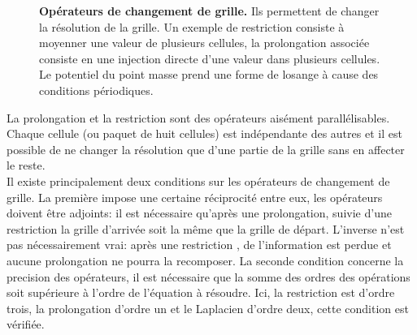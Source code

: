 \begin{figure}[htbp]
\begin{center}
\caption{\textbf{Opérateurs de changement de grille.} Ils permettent de changer la résolution de la grille. Un exemple de restriction consiste à moyenner une valeur de plusieurs cellules, la prolongation associée consiste en une injection directe d'une valeur dans plusieurs cellules.\\
Le potentiel du point masse prend une forme de losange à cause des conditions périodiques.}
\label{Opérateurs de changement de grille}
\end{center}
\end{figure}

La prolongation et la restriction sont des opérateurs aisément parallélisables. Chaque cellule (ou paquet de huit cellules) est indépendante des autres et il est possible de ne changer la résolution que d'une partie de la grille sans en affecter le reste.\\

Il existe principalement deux conditions sur les opérateurs de changement de grille. La première impose une certaine réciprocité entre eux, les opérateurs doivent être adjoints: il est nécessaire qu'après une prolongation, suivie d'une restriction la grille d'arrivée soit la même que la grille de départ. L'inverse n'est pas nécessairement vrai: après une restriction , de l'information est perdue et aucune prolongation ne pourra la recomposer. 
La seconde condition concerne la precision des opérateurs, il est nécessaire que la somme des ordres des opérations soit supérieure à l'ordre de l'équation à résoudre. Ici, la restriction est d'ordre trois, la prolongation d'ordre un et le Laplacien d'ordre deux, cette condition est vérifiée.




